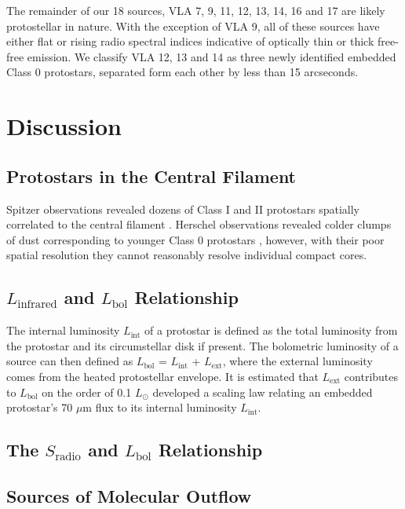 \documentclass[apj]{emulateapj}
\begin{document}
The remainder of our 18 sources, VLA 7, 9, 11, 12, 13, 14, 16 and 17 are likely protostellar in nature. With the exception of VLA 9, all of these sources have either flat or rising radio spectral indices indicative of optically thin or thick free-free emission. We classify VLA 12, 13 and 14 as three newly identified embedded Class 0 protostars, separated form each other by less than 15 arcseconds.

\section{Discussion}

\subsection{Protostars in the Central Filament}
Spitzer observations revealed dozens of Class I and II protostars spatially correlated to the central filament \citep{Gutermuth08}. Herschel observations revealed colder clumps of dust corresponding to younger Class 0 protostars \citep{Bontemps10}, however, with their poor spatial resolution they cannot reasonably resolve individual compact cores. 


\subsection{$L_{\text{infrared}}$ and $L_{\text{bol}}$ Relationship}

The internal luminosity $L_{\text{int}}$ of a protostar is defined as the total luminosity from the protostar and its circumstellar disk if present. The bolometric luminosity of a source can then defined as $L_{\text{bol}}$ = $L_{\text{int}}$ + $L_{\text{ext}}$, where the external luminosity comes from the heated protostellar envelope. It is estimated that $L_{\text{ext}}$ contributes to $L_{\text{bol}}$ on the order of 0.1 $L_{\odot}$ \citet{Dunham08} developed a scaling law relating an embedded protostar's 70 $\mu$m flux to its internal luminosity $L_{\text{int}}$.



\subsection{The $S_{\text{radio}}$ and $L_{\text{bol}}$ Relationship}




\subsection{Sources of Molecular Outflow}
\end{document}
